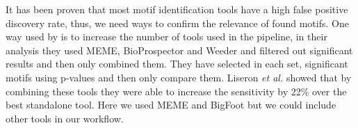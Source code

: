 It has been proven that most motif identification tools have a high false positive discovery rate, thus, we need ways to confirm the relevance of found motifs. One way used by \citealt{liseron-monfils_promzea:_2013} is to increase the number of tools used in the pipeline, in their analysis they used MEME, BioProspector and Weeder and filtered out significant results and then only combined them. They have selected in each set, significant motifs using p-values and then only compare them. Liseron \textit{et al.} showed that by combining these tools they were able to increase the sensitivity by 22\% over the best standalone tool. Here we used MEME and BigFoot but we could include other tools in our workflow.